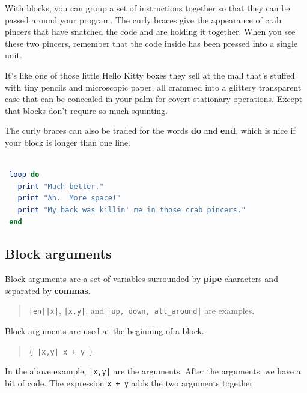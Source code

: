 \documentclass[10pt,twoside]{report}
\begin{document}
With blocks, you can group a set of instructions together so that they
can be passed around your program.  The curly braces give the
appearance of crab pincers that have snatched the code and are holding
it together.  When you see these two pincers, remember that the code
inside has been pressed into a single unit.

It's like one of those little Hello Kitty boxes they sell at the mall
that's stuffed with tiny pencils and microscopic paper, all crammed
into a glittery transparent case that can be concealed in your palm
for covert stationary operations.  Except that blocks don't require so
much squinting.

The curly braces can also be traded for the words {\bf do} and {\bf
  end}, which is nice if your block is longer than one line.


\begin{lstlisting}[basicstyle=\ttfamily\color{basiccolor},
    commentstyle = \ttfamily\color{commentcolor},
    keywordstyle=\ttfamily\color{keywordscolor},
    stringstyle=\color{stringcolor},
    language=Ruby,
    basicstyle=\small\ttfamily,
    showstringspaces=false,
  ]

 loop do
   print "Much better."
   print "Ah.  More space!"
   print "My back was killin' me in those crab pincers."
 end

\end{lstlisting}





\subsection{Block arguments}



Block arguments are a set of variables surrounded by {\bf pipe}
characters and separated by {\bf commas}.

\begin{quote}
\lstinline[breaklines=true]$|en||x|$,
\lstinline[breaklines=true]$|x,y|$, and
\lstinline[breaklines=true]$|up, down, all_around|$ are
examples.\end{quote}


Block arguments are used at the beginning of a block.

\begin{quote}
\lstinline[breaklines=true]${ |x,y| x + y }$\end{quote}


In the above example, \lstinline[breaklines=true]$|x,y|$ are the
arguments.  After the arguments, we have a bit of code.  The
expression \lstinline[breaklines=true]|x + y| adds the two arguments
together.
\end{document}

